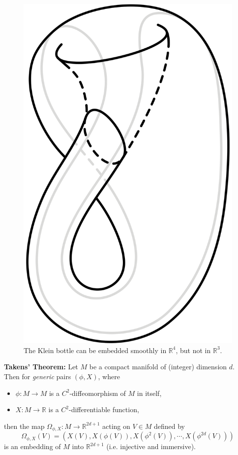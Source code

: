 \documentclass[12pt]{article}
\theoremstyle{definition}
\theoremstyle{remark}
\begin{document}
\begin{figure}[H]
    \centering
    \includegraphics[scale=0.1]{figures/klein_bottle.png}
    \caption{The Klein bottle can be embedded smoothly in $\mathbb R^4$, but not in $\mathbb R^3$.}
\end{figure}

\textbf{Takens' Theorem:}
Let $M$ be a compact manifold of (integer) dimension $d$. Then for \textit{generic} pairs $(\phi, X)$, where
\begin{itemize}
    \item $\phi : M \to M$ is a $C^2$-diffeomorphism of $M$ in itself,
    \item $X : M \to \mathbb R$ is a $C^2$-differentiable function,
\end{itemize}
then the map $\Omega_{\phi, X} : M \to \mathbb R^{2d + 1}$ acting on $V \in M$ defined by
\[ \Omega_{\phi, X}(V) = ( X(V), X(\phi(V)), X(\phi^2(V)), \cdots, X(\phi^{2d}(V))) \]
is an embedding of $M$ into $\mathbb{R}^{2d+1}$ (i.e. injective and immersive).
\end{document}
